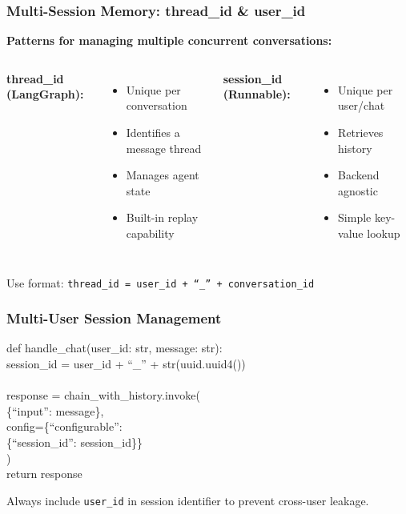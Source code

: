 \documentclass[aspectratio=169,11pt]{beamer}
\begin{document}
\begin{frame}
  \frametitle{Multi-Session Memory: thread\_id \& user\_id}
  \textbf{Patterns for managing multiple concurrent conversations:}
  \vspace{0.6em}
  \begin{columns}
    \textbf{thread\_id (LangGraph):}
    \begin{itemize}
      \item Unique per conversation
      \item Identifies a message thread
      \item Manages agent state
      \item Built-in replay capability
    \end{itemize}

    \textbf{session\_id (Runnable):}
    \begin{itemize}
      \item Unique per user/chat
      \item Retrieves history
      \item Backend agnostic
      \item Simple key-value lookup
    \end{itemize}
  \end{columns}
  \vspace{0.8em}
  \begin{tipbox}
    Use format: \texttt{thread\_id = user\_id + ``\_'' + conversation\_id}
  \end{tipbox}
\end{frame}

\begin{frame}
  \frametitle{Multi-User Session Management}
  \begin{codebox}
    \ttfamily\small
    def handle\_chat(user\_id: str, message: str): \\
    \hspace{2em} session\_id = user\_id + ``\_'' + str(uuid.uuid4()) \\
    \\
    \hspace{2em} response = chain\_with\_history.invoke( \\
    \hspace{4em} \{``input'': message\}, \\
    \hspace{4em} config=\{``configurable'': \\
    \hspace{6em} \{``session\_id'': session\_id\}\} \\
    \hspace{2em} ) \\
    \hspace{2em} return response
  \end{codebox}
  \vspace{0.6em}
  Always include \texttt{user\_id} in session identifier to prevent cross-user leakage.
\end{frame}
\end{document}
